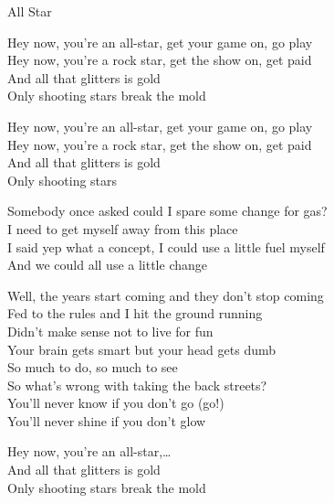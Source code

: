 \begin{song}{All Star}
  \begin{SBChorus}
    Hey now, you're an all-star, get your game on, go play\\
    Hey now, you're a rock star, get the show on, get paid\\
    And all that glitters is gold\\
    Only shooting stars break the mold
  \end{SBChorus}


  \begin{SBChorus}
    Hey now, you're an all-star, get your game on, go play\\
    Hey now, you're a rock star, get the show on, get paid\\
    And all that glitters is gold\\
    Only shooting stars
  \end{SBChorus}

  \begin{SBSection*}
    Somebody once asked could I spare some change for gas?\\
    I need to get myself away from this place\\
    I said yep what a concept, I could use a little fuel myself\\
    And we could all use a little change
  \end{SBSection*}

  \begin{SBVerse}
    Well, the years start coming and they don't stop coming\\
    Fed to the rules and I hit the ground running\\
    Didn't make sense not to live for fun\\
    Your brain gets smart but your head gets dumb\\\medskip
    So much to do, so much to see\\
    So what's wrong with taking the back streets?\\
    You'll never know if you don't go (go!)\\
    You'll never shine if you don't glow
  \end{SBVerse}

  \begin{SBChorus}
    Hey now, you're an all-star,\ldots\\\medskip
    And all that glitters is gold\\
    Only shooting stars break the mold\\
  \end{SBChorus}
\end{song}